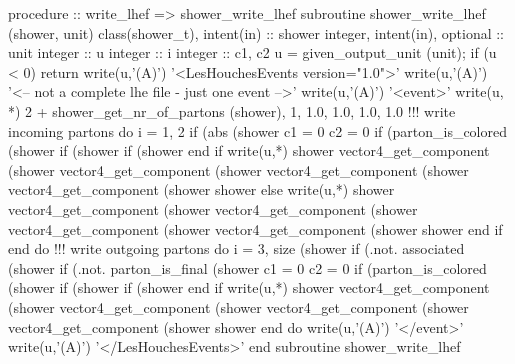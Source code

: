 \eatline
\nwendcode{}\nwdocspar
\nwenddocs{}\plusendmoddef
  procedure :: write_lhef => shower_write_lhef
\nwendcode{}\plusendmoddef
  subroutine shower_write_lhef (shower, unit)
    class(shower_t), intent(in) :: shower
    integer, intent(in), optional :: unit
    integer :: u
    integer :: i
    integer :: c1, c2
    u = given_output_unit (unit);  if (u < 0)  return
    write(u,'(A)') '<LesHouchesEvents version="1.0">'
    write(u,'(A)') '<-- not a complete lhe file - just one event -->'
    write(u,'(A)') '<event>'
    write(u, *) 2 + shower_get_nr_of_partons (shower), 1, 1.0, 1.0, 1.0, 1.0
    !!! write incoming partons
    do i = 1, 2
       if (abs (shower%
          c1 = 0
          c2 = 0
          if (parton_is_colored (shower%
             if (shower%
             if (shower%
          end if
          write(u,*) shower%
               vector4_get_component (shower%
               vector4_get_component (shower%
               vector4_get_component (shower%
               vector4_get_component (shower%
               shower%
       else
          write(u,*) shower%
               vector4_get_component (shower%
               vector4_get_component (shower%
               vector4_get_component (shower%
               vector4_get_component (shower%
               shower%
       end if
    end do
    !!! write outgoing partons
    do i = 3, size (shower%
       if (.not. associated (shower%
       if (.not. parton_is_final (shower%
       c1 = 0
       c2 = 0
       if (parton_is_colored (shower%
          if (shower%
          if (shower%
       end if
       write(u,*) shower%
            vector4_get_component (shower%
            vector4_get_component (shower%
            vector4_get_component (shower%
            vector4_get_component (shower%
            shower%
    end do
    write(u,'(A)') '</event>'
    write(u,'(A)') '</LesHouchesEvents>'
  end subroutine shower_write_lhef

